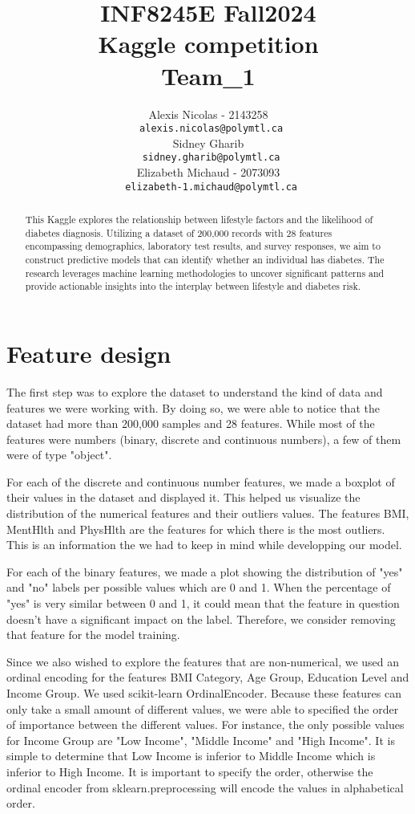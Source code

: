 \documentclass{article} %
\title{INF8245E Fall2024  \\ Kaggle competition \\ Team\_1 }
\author{Alexis Nicolas - 2143258 \\
\texttt{\ alexis.nicolas@polymtl.ca} \\
\And
Sidney Gharib \\
\texttt{\ sidney.gharib@polymtl.ca} \\
\And
Elizabeth Michaud - 2073093 \\
\texttt{\ elizabeth-1.michaud@polymtl.ca} \\
}
\begin{document}
\maketitle

\begin{abstract}
This Kaggle explores the relationship between lifestyle factors and the likelihood of diabetes diagnosis.
Utilizing a dataset of 200,000 records with 28 features encompassing demographics,
laboratory test results, and survey responses, we aim to construct predictive models that can identify whether an individual has diabetes.
The research leverages machine learning methodologies to uncover significant patterns and provide actionable insights into the interplay between lifestyle and diabetes risk.
\end{abstract}

\section{Feature design}

The first step was to explore the dataset to understand the kind of data and features we were working with. By doing so, we were 
able to notice that the dataset had more than 200,000 samples and 28 features. While most of the features were numbers 
(binary, discrete and continuous numbers), a few of them were of type "object". 

For each of the discrete and continuous number features, we made a boxplot of their values in the dataset and displayed it. 
This helped us visualize the distribution of the numerical features and their outliers values. The features BMI, MentHlth and PhysHlth
are the features for which there is the most outliers. This is an information the we had to keep in mind while developping our model.

For each of the binary features, we made a plot showing the distribution of "yes" and "no" labels per possible values which are 0 and 1. 
When the percentage of "yes" is very similar between 0 and 1, it could mean that the feature in question doesn't have a significant 
impact on the label. Therefore, we consider removing that feature for the model training. 

Since we also wished to explore the features that are non-numerical, we used an ordinal encoding for the features BMI Category, 
Age Group, Education Level and Income Group. We used scikit-learn OrdinalEncoder. Because these features can only take a small amount of different values, we were able to 
specified the order of importance between the different values. For instance, the only possible values for Income Group are "Low Income", 
"Middle Income" and "High Income". It is simple to determine that Low Income is inferior to Middle Income which is inferior to High 
Income. It is important to specify the order, otherwise the ordinal encoder from sklearn.preprocessing will encode the values in 
alphabetical order.
\end{document}
